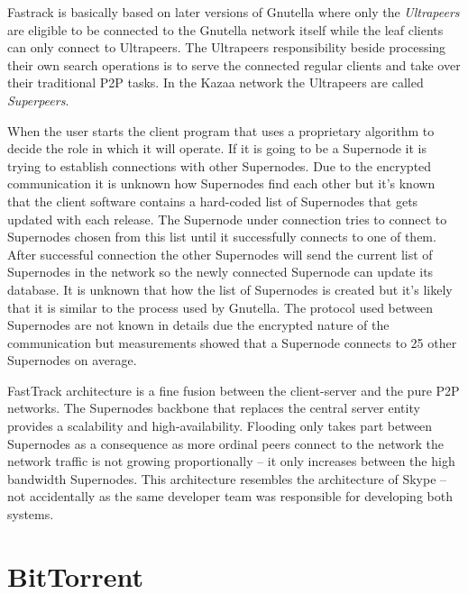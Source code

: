 \documentclass[a4paper]{article}
\begin{document}
Fastrack is basically based on later versions of Gnutella where only the \emph{Ultrapeers} are eligible to be connected
to the Gnutella network itself while the leaf clients can only connect to Ultrapeers. The Ultrapeers responsibility
beside processing their own search operations is to serve the connected regular clients and take over their traditional
P2P tasks. In the Kazaa network the Ultrapeers are called \emph{Superpeers}.

When the user starts the client program that uses a proprietary algorithm to decide the role in which it will operate.
If it is going to be a Supernode it is trying to establish connections with other Supernodes. Due to the encrypted
communication it is unknown how Supernodes find each other but it's known that the client software contains a
hard-coded list of Supernodes that gets updated with each release. The Supernode under connection tries to connect to
Supernodes chosen from this list until it successfully connects to one of them. After successful connection the other
Supernodes will send the current list of Supernodes in the network so the newly connected Supernode can update its
database. It is unknown that how the list of Supernodes is created but it's likely that it is similar to the process
used by Gnutella. The protocol used between Supernodes are not known in details due the encrypted nature of the
communication but measurements showed that a Supernode connects to 25 other Supernodes on average.

FastTrack architecture is a fine fusion between the client-server and the pure P2P networks. The Supernodes backbone
that replaces the central server entity provides a scalability and high-availability. Flooding only takes part between
Supernodes as a consequence as more ordinal peers connect to the network the network traffic is not growing
proportionally -- it only increases between the high bandwidth Supernodes. This architecture resembles the architecture
of Skype -- not accidentally as the same developer team was responsible for developing both systems.

\section{BitTorrent}
\end{document}
